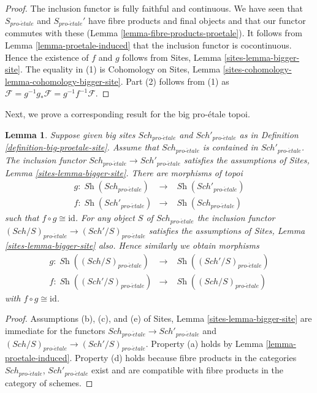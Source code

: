 \documentclass{stacks-project}
\theoremstyle{plain}
\newtheorem{lemma}[subsection]{Lemma}
\theoremstyle{definition}
\theoremstyle{remark}
\numberwithin{equation}{subsection}
\def\Sch{\mathit{Sch}}
\def\Sh{\mathop{\mathit{Sh}}\nolimits}
\def\proetale{{pro\text{-}\acute{e}tale}}
\begin{document}
\begin{proof}
The inclusion functor is fully faithful and continuous.
We have seen that $S_\proetale$ and $S_\proetale'$ have fibre products
and final objects and that our functor commutes with these
(Lemma \ref{lemma-fibre-products-proetale}).
It follows from Lemma \ref{lemma-proetale-induced}
that the inclusion functor is cocontinuous.
Hence the existence of $f$ and $g$ follows from
Sites, Lemma \ref{sites-lemma-bigger-site}.
The equality in (1) is
Cohomology on Sites, Lemma \ref{sites-cohomology-lemma-cohomology-bigger-site}.
Part (2) follows from (1) as
$\mathcal{F} = g^{-1}g_*\mathcal{F} = g^{-1}f^{-1}\mathcal{F}$.
\end{proof}

\noindent
Next, we prove a corresponding result for the big pro-\'etale topoi.

\begin{lemma}
\label{lemma-change-alpha}
Suppose given big sites $\Sch_\proetale$ and $\Sch'_\proetale$ as in
Definition \ref{definition-big-proetale-site}.
Assume that $\Sch_\proetale$ is contained in $\Sch'_\proetale$.
The inclusion functor $\Sch_\proetale \to \Sch'_\proetale$ satisfies
the assumptions of Sites, Lemma \ref{sites-lemma-bigger-site}.
There are morphisms of topoi
\begin{eqnarray*}
g : \Sh(\Sch_\proetale) &
\longrightarrow &
\Sh(\Sch'_\proetale) \\
f : \Sh(\Sch'_\proetale) &
\longrightarrow &
\Sh(\Sch_\proetale)
\end{eqnarray*}
such that $f \circ g \cong \text{id}$. For any object $S$
of $\Sch_\proetale$ the inclusion functor
$(\Sch/S)_\proetale \to (\Sch'/S)_\proetale$ satisfies
the assumptions of Sites, Lemma \ref{sites-lemma-bigger-site}
also. Hence similarly we obtain morphisms
\begin{eqnarray*}
g : \Sh((\Sch/S)_\proetale) &
\longrightarrow &
\Sh((\Sch'/S)_\proetale) \\
f : \Sh((\Sch'/S)_\proetale) &
\longrightarrow &
\Sh((\Sch/S)_\proetale)
\end{eqnarray*}
with $f \circ g \cong \text{id}$.
\end{lemma}

\begin{proof}
Assumptions (b), (c), and (e) of
Sites, Lemma \ref{sites-lemma-bigger-site}
are immediate for the functors
$\Sch_\proetale \to \Sch'_\proetale$ and
$(\Sch/S)_\proetale \to (\Sch'/S)_\proetale$. Property (a) holds by
Lemma \ref{lemma-proetale-induced}.
Property (d) holds because
fibre products in the categories $\Sch_\proetale$, $\Sch'_\proetale$
exist and are compatible with fibre products in the category of schemes.
\end{proof}
\end{document}
